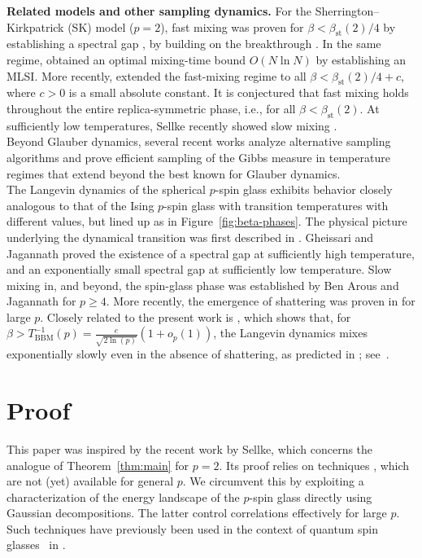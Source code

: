 \documentclass[letterpaper, DIV=17]{scrartcl}
\numberwithin{equation}{section}
\theoremstyle{definition}
\begin{document}
\bigskip
\noindent
\textbf{Related models and other sampling dynamics.}
For the Sherrington--Kirkpatrick (SK) model ($p=2$), fast mixing was proven for $\beta<\beta_{\mathrm{st}}(2)/4$ by establishing a spectral gap \cite{EKZ22}, by building on the breakthrough \cite{BB19}. In the same regime, \cite{AnEA21} obtained an optimal mixing-time bound $O(N\ln N)$ by establishing an MLSI. More recently, \cite{AKV24} extended the fast-mixing regime to all $\beta<\beta_{\mathrm{st}}(2)/4+c$, where $c>0$ is a small absolute constant. It is conjectured that fast mixing holds throughout the entire replica-symmetric phase, i.e., for all $\beta<\beta_{\mathrm{st}}(2)$. 
At sufficiently low temperatures, Sellke recently showed slow mixing \cite{S25}.\\


Beyond Glauber dynamics, several recent works \cite{AMS25_sampling,DLSS26,HMP24,HMRW24} analyze alternative sampling algorithms and prove efficient sampling of the Gibbs measure in temperature regimes that extend beyond the best known for Glauber dynamics.\\


The Langevin dynamics of the spherical $p$-spin glass exhibits behavior closely analogous to that of the Ising $p$-spin glass with transition temperatures with different values, but lined up as in Figure~\ref{fig:beta-phases}. The physical picture underlying the dynamical transition was first described in \cite{CHS93,CK93}. Gheissari and Jagannath \cite{GJ19} proved the existence of a spectral gap at sufficiently high temperature, and an exponentially small spectral gap at sufficiently low temperature. Slow mixing in, and beyond, the spin-glass phase was established by Ben Arous and Jagannath \cite{BJ18,BJ24} for $p \geq 4$. More recently, the emergence of shattering was proven in \cite{AMS25_spherical} for large $p$.
Closely related to the present work is  \cite[Theorem~2.6]{BJ24}, which shows that, for $\beta > T_{\mathrm{BBM}}^{-1}(p) =\frac{e}{\sqrt{2\ln (p)}}(1+o_p(1))$, the Langevin dynamics mixes exponentially slowly even in the absence of shattering, as predicted in \cite{BBM96}; see~\cite[Equation A.37]{BBM96}.

\section{Proof}\label{sec:proof}
This paper was inspired by the recent work \cite{S25} by Sellke, which concerns the analogue of Theorem~\ref{thm:main} for $ p = 2 $. Its proof \cite{S25} relies on techniques \cite{DGZ25,HS25}, which are not (yet) available for general $p$. We circumvent this by exploiting a characterization of the energy landscape of the $ p$-spin glass directly using  Gaussian decompositions. The latter control correlations effectively for large $ p $. Such techniques have previously been used in the context of quantum spin glasses~\cite{MW20,MW21b,MW25} in \cite{kmw26}.  
\end{document}
